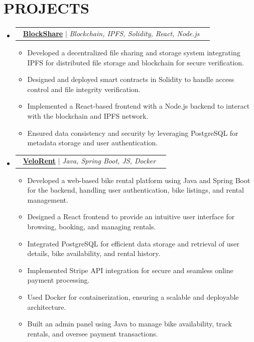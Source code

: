 \documentclass[letterpaper,11pt]{article}
\makeatletter
\newcommand{\resumeItem}[1]{
  \item\small{
    {#1 \vspace{-2pt}}
  }
}
\newcommand{\resumeProjectHeading}[2]{
    \item
    \begin{tabular*}{0.97\textwidth}{l@{\extracolsep{\fill}}r}
      \small#1 & #2 \\
    \end{tabular*}\vspace{-7pt}
}
\newcommand{\resumeSubHeadingListStart}{\begin{itemize}[leftmargin=0.15in, label={}]}
\newcommand{\resumeSubHeadingListEnd}{\end{itemize}}
\newcommand{\resumeItemListStart}{\begin{itemize}}
\newcommand{\resumeItemListEnd}{\end{itemize}\vspace{-5pt}}
\makeatother
\begin{document}
\section{\textbf{\MakeUppercase{projects}}}
    \resumeSubHeadingListStart
      \resumeProjectHeading
          {\textbf{{\color{linkcolor}\faExternalLink}\ \href{https://github.com/crafteraadarsh/BlockShare}{BlockShare}} $|$ \emph{Blockchain, IPFS, Solidity, React, Node.js}}{}
          \resumeItemListStart
            \resumeItem{Developed a decentralized file sharing and storage system integrating IPFS for distributed file storage and blockchain for secure verification.}
            \resumeItem{Designed and deployed smart contracts in Solidity to handle access control and file integrity verification.}
            \resumeItem{Implemented a React-based frontend with a Node.js backend to interact with the blockchain and IPFS network.}
            \resumeItem{Ensured data consistency and security by leveraging PostgreSQL for metadata storage and user authentication.}
          \resumeItemListEnd
      \resumeProjectHeading
          {\textbf{{\color{linkcolor}\faExternalLink}\ \href{https://github.com/crafteraadarsh/VeloRent}{VeloRent}} $|$ \emph{Java, Spring Boot, JS, Docker}}{}
          \resumeItemListStart
            \resumeItem{Developed a web-based bike rental platform using Java and Spring Boot for the backend, handling user authentication, bike listings, and rental management.}
            \resumeItem{Designed a React frontend to provide an intuitive user interface for browsing, booking, and managing rentals.}
            \resumeItem{Integrated PostgreSQL for efficient data storage and retrieval of user details, bike availability, and rental history.}
            \resumeItem{Implemented Stripe API integration for secure and seamless online payment processing.}
            \resumeItem{Used Docker for containerization, ensuring a scalable and deployable architecture.}
            \resumeItem{Built an admin panel using Java to manage bike availability, track rentals, and oversee payment transactions.}
          \resumeItemListEnd
    \resumeSubHeadingListEnd

\end{document}
